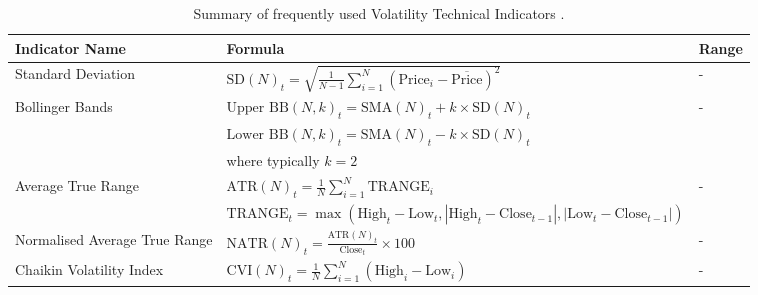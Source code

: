 \begin{table}[htb!]
\centering
\footnotesize
\begin{tabularx}{\textwidth}{@{}lXl@{}}
\toprule
\textbf{Indicator Name} & \textbf{Formula} & \textbf{Range} \\ 
\midrule
Standard Deviation & $\text{SD}(N)_t = \sqrt{\frac{1}{N-1} \sum_{i=1}^{N} (\text{Price}_i - \overline{\text{Price}})^2}$ & - \\
\addlinespace
Bollinger Bands & $\text{Upper BB}(N, k)_t = \text{SMA}(N)_t + k \times \text{SD}(N)_t$ & - \\
\addlinespace
& $\text{Lower BB}(N, k)_t = \text{SMA}(N)_t - k \times \text{SD}(N)_t$ & \\
\addlinespace
& where typically $ k = 2 $& \\
\addlinespace
Average True Range & $\text{ATR}(N)_t = \frac{1}{N} \sum_{i=1}^{N} \text{TRANGE}_i$ & - \\
\addlinespace
& $\text{TRANGE}_t = \max(\text{High}_t - \text{Low}_t, |\text{High}_t - \text{Close}_{t-1}|, |\text{Low}_t - \text{Close}_{t-1}|)$ & \\
\addlinespace
Normalised Average True Range & $\text{NATR}(N)_t = \frac{\text{ATR}(N)_t}{\text{Close}_t} \times 100$ & - \\
\addlinespace
Chaikin Volatility Index & $\text{CVI}(N)_t = \frac{1}{N} \sum_{i=1}^{N} (\text{High}_i - \text{Low}_i)$ & - \\
\bottomrule
\end{tabularx}
\caption{Summary of frequently used Volatility Technical Indicators \cite{jansen_machine_2020}.}
\label{Tables:VolatilityIndicators}
\end{table}
